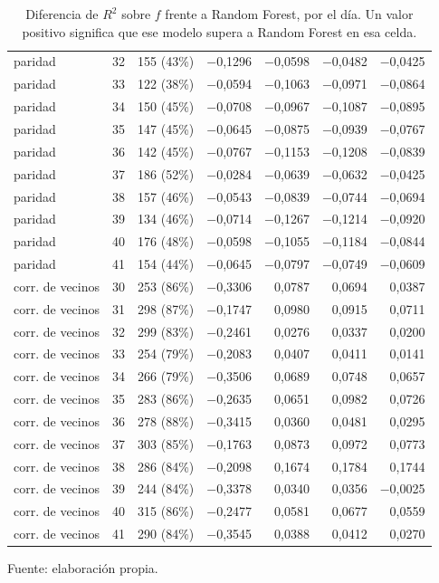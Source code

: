 \begin{table}[htbp]
{\begin{tabular}{@{}lrrrrrr@{}}
        paridad & 32 & 155 (43\%) & $-$0,1296 & $-$0,0598 & $-$0,0482 & $-$0,0425 \\
        paridad & 33 & 122 (38\%) & $-$0,0594 & $-$0,1063 & $-$0,0971 & $-$0,0864 \\
        paridad & 34 & 150 (45\%) & $-$0,0708 & $-$0,0967 & $-$0,1087 & $-$0,0895 \\
        paridad & 35 & 147 (45\%) & $-$0,0645 & $-$0,0875 & $-$0,0939 & $-$0,0767 \\
        paridad & 36 & 142 (45\%) & $-$0,0767 & $-$0,1153 & $-$0,1208 & $-$0,0839 \\
        paridad & 37 & 186 (52\%) & $-$0,0284 & $-$0,0639 & $-$0,0632 & $-$0,0425 \\
        paridad & 38 & 157 (46\%) & $-$0,0543 & $-$0,0839 & $-$0,0744 & $-$0,0694 \\
        paridad & 39 & 134 (46\%) & $-$0,0714 & $-$0,1267 & $-$0,1214 & $-$0,0920 \\
        paridad & 40 & 176 (48\%) & $-$0,0598 & $-$0,1055 & $-$0,1184 & $-$0,0844 \\
        paridad & 41 & 154 (44\%) & $-$0,0645 & $-$0,0797 & $-$0,0749 & $-$0,0609 \\
        corr. de vecinos & 30 & 253 (86\%) & $-$0,3306 & 0,0787 & 0,0694 & 0,0387 \\
        corr. de vecinos & 31 & 298 (87\%) & $-$0,1747 & 0,0980 & 0,0915 & 0,0711 \\
        corr. de vecinos & 32 & 299 (83\%) & $-$0,2461 & 0,0276 & 0,0337 & 0,0200 \\
        corr. de vecinos & 33 & 254 (79\%) & $-$0,2083 & 0,0407 & 0,0411 & 0,0141 \\
        corr. de vecinos & 34 & 266 (79\%) & $-$0,3506 & 0,0689 & 0,0748 & 0,0657 \\
        corr. de vecinos & 35 & 283 (86\%) & $-$0,2635 & 0,0651 & 0,0982 & 0,0726 \\
        corr. de vecinos & 36 & 278 (88\%) & $-$0,3415 & 0,0360 & 0,0481 & 0,0295 \\
        corr. de vecinos & 37 & 303 (85\%) & $-$0,1763 & 0,0873 & 0,0972 & 0,0773 \\
        corr. de vecinos & 38 & 286 (84\%) & $-$0,2098 & 0,1674 & 0,1784 & 0,1744 \\
        corr. de vecinos & 39 & 244 (84\%) & $-$0,3378 & 0,0340 & 0,0356 & $-$0,0025 \\
        corr. de vecinos & 40 & 315 (86\%) & $-$0,2477 & 0,0581 & 0,0677 & 0,0559 \\
        corr. de vecinos & 41 & 290 (84\%) & $-$0,3545 & 0,0388 & 0,0412 & 0,0270 \\
        \bottomrule
    \end{tabular}}

    \caption{Diferencia de $R^2$ sobre $f$ frente a Random Forest, por el día. Un valor positivo significa que ese modelo supera a Random Forest en esa celda.}
    \label{tab:v3_tiempo_r2_dif}

    {\footnotesize Fuente: elaboración propia.}
\end{table}
